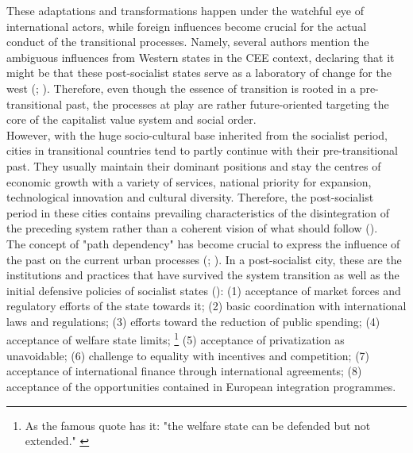 \documentclass[11pt]{report}
\begin{document}
{{{{These adaptations and transformations happen under the watchful eye of international actors, while foreign influences become crucial for the actual conduct of the transitional processes.
Namely, several authors mention the ambiguous influences from Western states in the CEE context, declaring that it might be that these post-socialist states serve as  a laboratory of change for the west (\href{Maier}{\citealt{maier_czech_1998}}; \href{ref}{\citealt{vujosevic_post-socialist_2010}}).
Therefore, even though the essence of transition is rooted in a pre-transitional past, the processes at play are rather future-oriented targeting the core of the capitalist value system and social order.
\\

However, with the huge socio-cultural base inherited from the socialist period, cities in transitional countries tend to partly continue with their pre-transitional past. They usually maintain their dominant positions and stay the centres of economic growth  with  a  variety  of  services, national priority for expansion,  technological  innovation  and  cultural  diversity. 
Therefore,  the  post-socialist period in these cities contains prevailing characteristics of the disintegration of the preceding system rather than a coherent vision of what should follow (\href{Stanilov}{\citealt{stanilov_post-socialist_2007}}). 
\\

The concept of "path dependency" has become crucial to express the influence of the past on the current urban processes (\citealt{Stark 1992}; \href{djordjevic}{\citealt{djordjevic_system_2009}}).
In a post-socialist city, these are the institutions and practices that have survived the system transition as well as the initial defensive policies of socialist states (\href{Thomas}{\citealt{thomas_thinking_1998}}): 
(1) acceptance of market  forces and regulatory efforts of the state towards it;
(2) basic coordination with international laws and regulations;
(3) efforts toward the reduction of public spending;
(4) acceptance of welfare state limits;
\footnote{As the famous quote has it: "the welfare  state can be defended  but  not  extended." \href{Thomas}{\citealt{thomas_thinking_1998}}}
(5) acceptance of  privatization  as unavoidable;
(6) challenge to equality with incentives and competition;
(7) acceptance of international finance through international agreements;
(8) acceptance of the opportunities contained in European  integration programmes.
\\

}}}}
\end{document}
